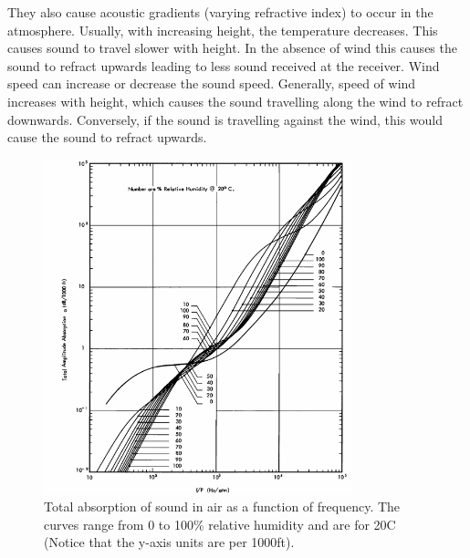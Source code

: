 They also cause acoustic gradients (varying refractive index) to occur in the atmosphere. Usually, with increasing height, the temperature decreases. This causes sound to travel slower with height. In the absence of wind this causes the sound to refract upwards leading to less sound received at the receiver. Wind speed can increase or decrease the sound speed. Generally, speed of wind increases with height, which causes the sound travelling along the wind to refract downwards. Conversely, if the sound is travelling against the wind, this would cause the sound to refract upwards.
\begin{figure}[h]
\includegraphics[width=0.8\textwidth]{Figures/airAbsorption.png}
\caption{Total absorption of sound in air as a function of frequency. The curves range from 0 to 100\% relative humidity and are for 20\degree C \cite{evans1972atmospheric} (Notice that the y-axis units are per 1000ft).}
\label{Fig:airAbsorption}
\end{figure}
